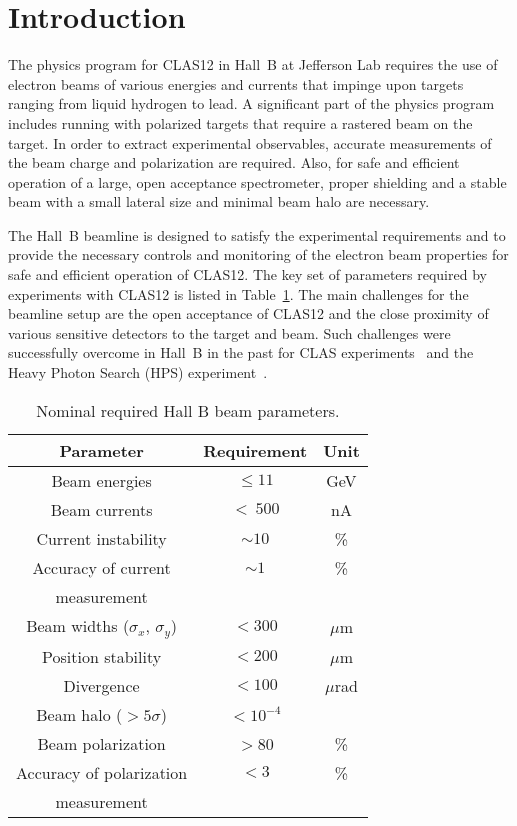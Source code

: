 \section{Introduction}
\label{introduction}

The physics program for CLAS12 in Hall~B at Jefferson Lab requires the use of electron beams of various
energies and currents that impinge upon targets ranging from liquid hydrogen to lead. A significant part of
the physics program includes running with polarized targets that require a rastered beam on the target. In
order to extract experimental observables, accurate measurements of the beam charge and polarization are
required. Also, for safe and efficient operation of a large, open acceptance spectrometer, proper shielding
and a stable beam with a small lateral size and minimal beam halo are necessary. 

The Hall~B beamline is designed to satisfy the experimental requirements and to provide the necessary controls
and monitoring of the electron beam properties for safe and efficient operation of CLAS12. The key set of
parameters required by experiments with CLAS12 is listed in Table~\ref{tab:beam_par}. The main challenges
for the beamline setup are the open acceptance of CLAS12 and the close proximity of various sensitive detectors
to the target and beam. Such challenges were successfully overcome in Hall~B in the past for CLAS
experiments~\cite{CLAS} and the Heavy Photon Search (HPS) experiment~\cite{HPS}.

 \begin{table}[htb]
 \centering
 \begin{tabular}{|c|c|c|}
\hline
Parameter & Requirement &Unit \\ \hline 
Beam energies &  $\le 11$& GeV \\ \hline
Beam currents & $<~500$ & nA \\ \hline
Current instability & $\sim 10$ &\% \\ \hline 
Accuracy of current& $\sim 1$ &\% \\ 
measurement & &\\ \hline 
Beam widths ($\sigma_x $, $\sigma_y$)&$< 300$& $\mu$m \\ \hline 
Position stability &$< 200$ &$\mu$m \\ \hline
Divergence& $< 100$& $\mu$rad \\ \hline 
Beam halo ($> 5\sigma$) &$< 10^{-4}$& \\ \hline
Beam polarization &$>$80 & \%\\ \hline
Accuracy of polarization&$<3$&\% \\ 
measurement&& \\ \hline
\end{tabular}
\caption{Nominal required Hall B beam parameters.} 
\label{tab:beam_par}
\end{table}

